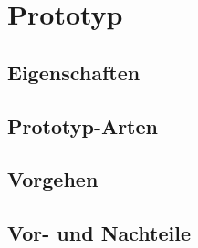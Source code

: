\chapter{Prototyp} \label{prototyp}

\section{Eigenschaften} \label{eigenschaften}



\section{Prototyp-Arten} \label{prototyparten}


\section{Vorgehen} \label{prototyp_vorgehen}


\section{Vor- und Nachteile} \label{prototyp_vorteile}
